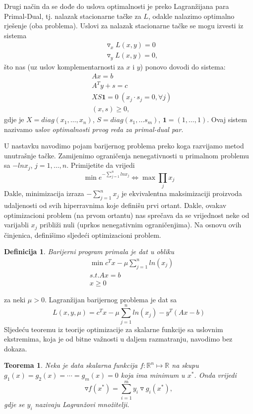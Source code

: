 \documentclass[a4paper, utf8, 11pt, colorlinks]{book}
\newtheorem{definition}{Definicija}
\newtheorem{thm}{Teorema}
\begin{document}
Drugi način da se dođe do uslova optimalnosti je preko Lagranžijana para Primal-Dual, tj. nalazak stacionarne tačke za $L$, odakle nalazimo optimalno rješenje (oba problema).  Uslovi za nalazak stacionarne tačke se mogu izvesti iz sistema
\begin{align}
	&\triangledown_x L(x,y) = 0\\
	&\triangledown_y L(x,y) = 0,
\end{align} 
što nas (uz uslov komplementarnosti za $x$ i $y$) ponovo dovodi do sistema:
\begin{align}
	&Ax = b \\
	&A^T y + s = c \\
	&XS\mathbf{1} = 0 \ (x_j \cdot s_j =0 , \forall j) \\
	&  (x, s ) \geq 0,
\end{align}
gdje je $X = diag (x_1, \ldots, x_n)$, $S= diag(s_1,\ldots s_m)$, $\mathbf{1}=(1,\ldots, 1)$. Ovaj sistem nazivamo \emph{uslov optimalnosti prvog reda za primal-dual par}. 

U nastavku navodimo pojam barijernog problema preko koga razvijamo metod unutrašnje tačke. Zamijenimo ograničenja nenegativnosti u primalnom problemu sa $-ln x_j$, $j=1,\ldots,n$.   
Primijetite da vrijedi 
$$\min e^{-\sum_{j=1}^n ln x_j} \Leftrightarrow \max \prod_{j} x_j $$
Dakle, minimizacija izraza $-\sum_{j=1}^n x_j$ je ekvivalentna maksimizaciji proizvoda udaljenosti od svih hiperravnima koje definišu prvi ortant. Dakle, ovakav optimizacioni problem (na prvom ortantu) nas sprečava da se vrijednost neke od varijabli $x_j$ približi nuli (uprkos nenegativnim ograničenjima).  Na osnovu ovih činjenica, definišimo sljedeći optimizacioni problem. 

\begin{definition}
	Barijerni program  primala je dat u obliku 
	\begin{align*}
		&\min c^T x - \mu \sum_{j=1}^n ln(x_j) \\
		&{s.t. } A x = b \\
		& x \geq 0
	\end{align*}
\end{definition}
za neki $\mu >0$. Lagranžijan barijernog problema je dat sa 
$$  L(x, y, \mu) = c^T x - \mu \sum_{j=1}^n ln(x_j)  - y^T(Ax - b) $$
Sljedeću teoremu iz teorije optimizacije  za skalarne funkcije sa uslovnim ekstremima, koja je od bitne važnosti u daljem razmatranju, navodimo   bez dokaza. 
\begin{thm}
	Neka je data skalarna funkcija  $f:\mathbb{R}^n \mapsto \mathbb{R}$ na skupu $g_1(x)=g_2(x)= \cdots = g_m(x) =0$ koja ima minimum u $x^*$. Onda vrijedi 
	$$ \triangledown f (x^*) = \sum_{i=1}^m y_i \triangledown g_i(x^*),$$
	gdje se $y_i$ nazivaju Lagranžovi množitelji. 
\end{thm}
\end{document}
